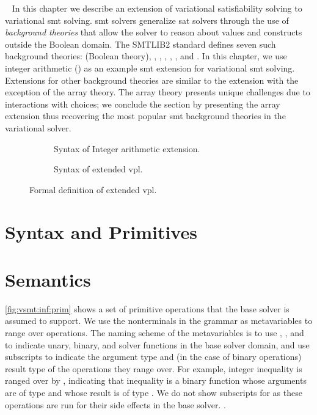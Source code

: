 ~\label{chapter:vsmt}
%
In this chapter we describe an extension of variational satisfiability solving
to variational \ac{smt} solving.
\ac{smt} solvers generalize \ac{sat} solvers through the use of \emph{background
  theories} that allow the solver to reason about values and constructs outside
the Boolean domain. The SMTLIB2 standard defines seven such background theories:
 (Boolean theory), , ,
, , , and . In this chapter,
we use integer arithmetic () as an example \ac{smt} extension for
variational \ac{smt} solving. Extensions for other background theories are
similar to the  extension with the exception of the array theory. The
array theory presents unique challenges due to interactions with choices; we
conclude the section by presenting the array extension thus recovering the most
popular \ac{smt} background theories in the variational solver.

\begin{figure}
  \begin{subfigure}[t]{\linewidth}
    \centering
    
    \caption{Syntax of Integer arithmetic extension.}%
    \label{fig:arith:stx}
  \end{subfigure}
  \begin{subfigure}[t]{\linewidth}
    
    \centering
    \caption{Syntax of extended \ac{vpl}.}%
    \label{fig:arith:vpl}
  \end{subfigure}
  \caption{Formal definition of extended \ac{vpl}.}%
  \label{fig:ex:vpl}
\end{figure}

\section{Syntax and Primitives}


\section{Semantics}
%
\autoref{fig:vsmt:inf:prim} shows a set of primitive operations that the base
solver is assumed to support. We use the nonterminals in the grammar as
metavariables to range over operations. The naming scheme of the metavariables
is to use \uop{}, \bop{}, and \sop{} to indicate unary, binary, and solver
functions in the base solver domain, and use subscripts to indicate the
argument type and (in the case of binary operations) result type of the
operations they range over.
%
For example, integer inequality is ranged over by \bib{}, indicating that
inequality is a binary function whose arguments are of type \integers{} and
whose result is of type \booleans{}.
%
We do not show subscripts for \sop{} as these operations are run for their side
effects in the base solver.
%
.

